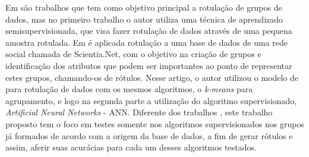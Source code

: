 Em  são trabalhos que tem como objetivo principal a rotulação de grupos de dados, mas no primeiro trabalho o autor utiliza uma técnica de aprendizado semisupervisionada, que visa fazer rotulação de dados através de uma pequena amostra rotulada. Em  é aplicada rotulação a uma base de dados de uma rede social chamada de Scientia.Net, com o objetivo na criação de grupos e identificação dos atributos que podem ser importantes ao ponto de representar estes grupos, chamando-os de rótulos. Nesse artigo, o autor utilizou o modelo de \cite{Lopes2016} para rotulação de dados com os mesmos algoritmos, o  \textit{k-means} para agrupamento, e logo na segunda parte a utilização do algoritmo supervisionado, \textit{Artificial Neural Networks} - ANN. Diferente dos trabalhos \cite{Metodo2015,DeLima2015}, este trabalho proposto tem o foco em testes somente nos algoritmos supervisionados nos grupos já formados de acordo com a origem da base de dados, a fim de gerar rótulos e assim, aferir suas acurácias para cada um desses algoritmos testados. 
% 
% 
% 
% 

